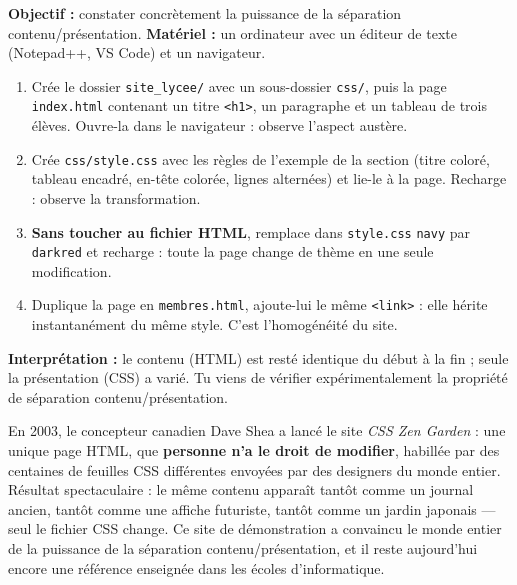 \documentclass[11pt]{article}
\begin{document}
\begin{experience}
\textbf{Objectif :} constater concrètement la puissance de la séparation contenu/présentation.
\textbf{Matériel :} un ordinateur avec un éditeur de texte (Notepad++, VS Code) et un navigateur.
\begin{enumerate}
\item Crée le dossier \texttt{site\_lycee/} avec un sous-dossier \texttt{css/}, puis la page \texttt{index.html} contenant un titre \texttt{<h1>}, un paragraphe et un tableau de trois élèves. Ouvre-la dans le navigateur : observe l'aspect austère.
\item Crée \texttt{css/style.css} avec les règles de l'exemple de la section (titre coloré, tableau encadré, en-tête colorée, lignes alternées) et lie-le à la page. Recharge : observe la transformation.
\item \textbf{Sans toucher au fichier HTML}, remplace dans \texttt{style.css} \texttt{navy} par \texttt{darkred} et recharge : toute la page change de thème en une seule modification.
\item Duplique la page en \texttt{membres.html}, ajoute-lui le même \texttt{<link>} : elle hérite instantanément du même style. C'est l'homogénéité du site.
\end{enumerate}
\textbf{Interprétation :} le contenu (HTML) est resté identique du début à la fin ; seule la présentation (CSS) a varié. Tu viens de vérifier expérimentalement la propriété de séparation contenu/présentation.
\end{experience}

\begin{savaistu}
En 2003, le concepteur canadien Dave Shea a lancé le site \emph{CSS Zen Garden} : une unique page HTML, que \textbf{personne n'a le droit de modifier}, habillée par des centaines de feuilles CSS différentes envoyées par des designers du monde entier. Résultat spectaculaire : le même contenu apparaît tantôt comme un journal ancien, tantôt comme une affiche futuriste, tantôt comme un jardin japonais — seul le fichier CSS change. Ce site de démonstration a convaincu le monde entier de la puissance de la séparation contenu/présentation, et il reste aujourd'hui encore une référence enseignée dans les écoles d'informatique.
\end{savaistu}
\end{document}
